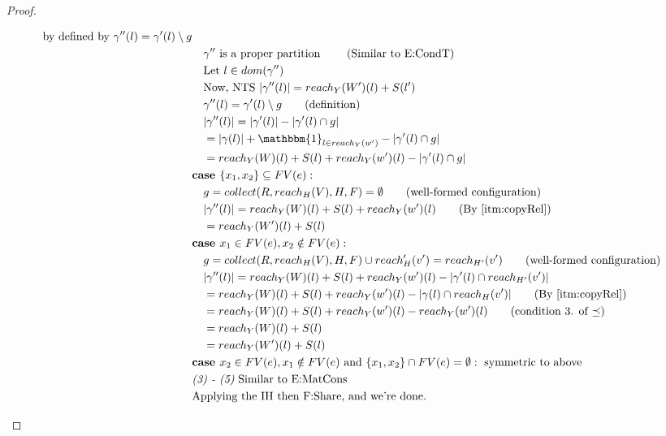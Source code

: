 \documentclass[11pt]{article}
\theoremstyle{definition}
\begin{document}
\begin{proof}
\begin{description}
\begin{align*}
			\text{ by defined by } \gamma''(l) =  \gamma'(l) \setminus g\\
		&\quad \gamma'' \text{ is a proper partition } \tag{Similar to E:CondT}\\
		&\quad \text{Let } l \in dom(\gamma'')\\
		&\quad \text{Now, NTS } |\gamma''(l)| = reach_{Y}(W')(l) + S(l')\\
		&\quad \gamma''(l) = \gamma'(l) \setminus g \tag{definition}\\ 
		&\quad |\gamma''(l)| = |\gamma'(l)| - |\gamma'(l) \cap g|\\
		&\quad = |\gamma(l)| + \mathbbm{1}_{l \in reach_Y(w')} - |\gamma'(l) \cap g|\\
		&\quad = reach_Y(W)(l) + S(l) + reach_Y(w')(l) - |\gamma'(l) \cap g|\\
		&\textbf{case } \{x_1,x_2\} \subseteq FV(e):\\
		&\quad g = collect(R,reach_H(V),H,F) = \emptyset \tag{well-formed configuration}\\
		&\quad |\gamma''(l)| = reach_Y(W)(l) + S(l) + reach_Y(w')(l) \tag{By \ref{itm:copyRel}}\\
		&\quad = reach_Y(W')(l) + S(l) \\
		&\textbf{case } x_1 \in FV(e), x_2 \notin FV(e):\\
		&\quad g = collect(R,reach_H(V),H,F) \cup reach_H'(v') = reach_{H'}(v') 
			\tag{well-formed configuration}\\
		&\quad |\gamma''(l)| = reach_Y(W)(l) + S(l) + reach_Y(w')(l)
			- |\gamma'(l) \cap reach_{H'}(v')|\\
		&\quad = reach_Y(W)(l) + S(l) + reach_Y(w')(l) - |\gamma(l) \cap reach_H(v')|
			\tag{By \ref{itm:copyRel}}\\
		&\quad = reach_Y(W)(l) + S(l) + reach_Y(w')(l) - reach_Y(w')(l) 
			\tag{condition 3. of $\preceq$}\\
		&\quad = reach_Y(W)(l) + S(l)\\
		&\quad = reach_Y(W')(l) + S(l)\\
		&\textbf{case } x_2 \in FV(e), x_1 \notin FV(e) 
			\text{ and } \{x_1,x_2\} \cap FV(e) = \emptyset: \text{ symmetric to above}\\
		&\emph{(3) - (5)} \text{ Similar to E:MatCons}\\ 
		&\text{Applying the IH then F:Share, and we're done. }
	\end{align*}
  \end{description}
\end{proof}
\end{document}
